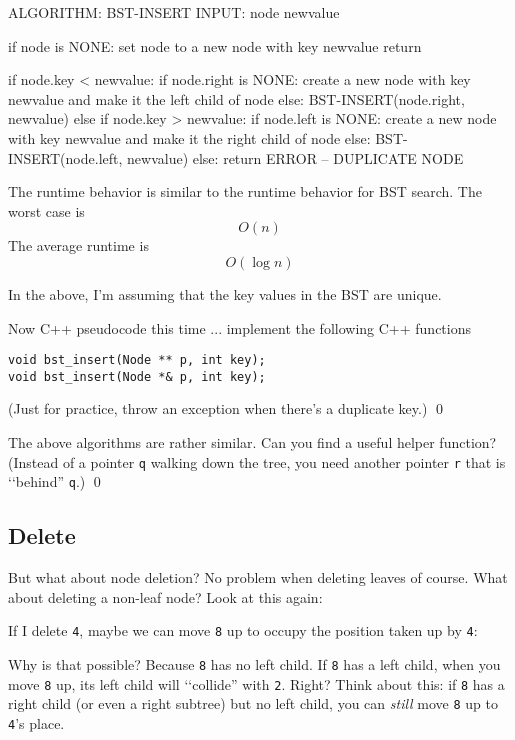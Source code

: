 \begin{console}
ALGORITHM: BST-INSERT
INPUT: node
       newvalue

if node is NONE:
    set node to a new node with key newvalue
    return
 
if node.key < newvalue:
    if node.right is NONE:
        create a new node with key newvalue and
        make it the left child of node
    else:
        BST-INSERT(node.right, newvalue)
else if node.key > newvalue:
    if node.left is NONE:
        create a new node with key newvalue and
        make it the right child of node
    else:
        BST-INSERT(node.left, newvalue)
else:
    return ERROR -- DUPLICATE NODE
\end{console}

The runtime behavior is similar to the runtime behavior for
BST search.
The worst case is
\[
O(n)
\]
The average runtime is
\[
O(\log n)
\]

In the above, I'm assuming that the key values in the BST
are unique.

\newpage
\begin{ex}
Now C++ pseudocode this time ... implement the following C++ functions
\begin{Verbatim}[frame=single]
void bst_insert(Node ** p, int key);
void bst_insert(Node *& p, int key);
\end{Verbatim}
(Just for practice, throw an exception when there's a duplicate key.)
\qed
\end{ex}


\newpage
\begin{ex}
The above algorithms are rather similar.
Can you find a useful helper function?
(Instead of a pointer \verb!q! walking down the tree, you need another
pointer \verb!r! that is \lq\lq behind'' \verb!q!.)
\qed
\end{ex}

\newpage
\subsection{Delete}

But what about node deletion?
No problem when deleting leaves of course.
What about deleting a non-leaf node?
Look at this again:



If I delete \verb!4!, maybe we can move \verb!8! up to occupy
the position taken up by \verb!4!:

Why is that possible?
Because \verb!8! has no left child.
If \verb!8! has a left child, when you move \verb!8! up,
its left child will \lq\lq collide'' with \verb!2!.
Right?
Think about this:
if \verb!8! has a right child (or even a right subtree) but no 
left child,
you can \textit{still} move \verb!8! up to \verb!4!'s place.

